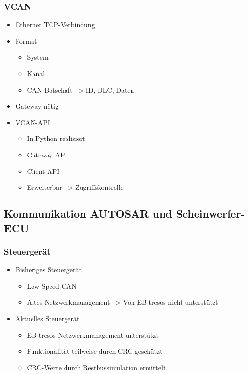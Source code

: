 \documentclass[]{beamer}
\begin{document}
\begin{frame}
\frametitle{VCAN}
    \begin{itemize}
        \item Ethernet TCP-Verbindung
        \item Format
        \begin{itemize}
            \item System
            \item Kanal
            \item CAN-Botschaft --> ID, DLC, Daten
        \end{itemize}        
        \item Gateway nötig
        \item VCAN-API
        \begin{itemize}
            \item In Python realisiert
            \item Gateway-API
            \item Client-API
            \item Erweiterbar --> Zugriffskontrolle
        \end{itemize}
    \end{itemize}
\end{frame}




\subsection{Kommunikation AUTOSAR und Scheinwerfer-ECU}
\begin{frame}
\frametitle{Steuergerät}
    \begin{itemize}
        \item Bisheriges Steuergerät
        \begin{itemize}
            \item Low-Speed-CAN
            \item Altes Netzwerkmanagement --> Von EB tresos nicht unterstützt
        \end{itemize}
        \item Aktuelles Steuergerät
        \begin{itemize}
            \item EB tresos Netzwerkmanagement unterstützt
            \item Funktionalität teilweise durch CRC geschützt
            \item CRC-Werte durch Restbussimulation ermittelt
        \end{itemize}
    \end{itemize}
\end{frame}
\end{document}
